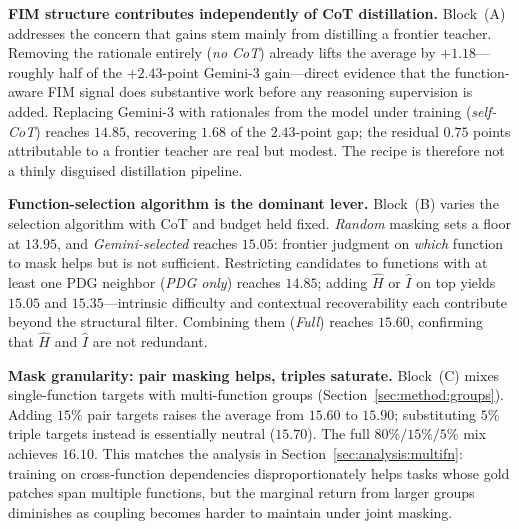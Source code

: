 

\textbf{FIM structure contributes independently of CoT distillation.}
Block~(A) addresses the concern that gains stem mainly from distilling
a frontier teacher. Removing the rationale entirely (\emph{no CoT})
already lifts the average by $+1.18$---roughly half of the $+2.43$-point
Gemini-3 gain---direct evidence that the function-aware FIM signal does
substantive work before any reasoning supervision is added. Replacing
Gemini-3 with rationales from the model under training
(\emph{self-CoT}) reaches $14.85$, recovering $1.68$ of the $2.43$-point
gap; the residual $0.75$ points attributable to a frontier teacher are
real but modest. The recipe is therefore not a thinly disguised
distillation pipeline.

\textbf{Function-selection algorithm is the dominant lever.}
Block~(B) varies the selection algorithm with CoT and budget held
fixed. \emph{Random} masking sets a floor at $13.95$, and
\emph{Gemini-selected} reaches $15.05$: frontier judgment on
\emph{which} function to mask helps but is not sufficient. Restricting
candidates to functions with at least one PDG neighbor (\emph{PDG only})
reaches $14.85$; adding $\hat{H}$ or $\hat{I}$ on top yields $15.05$ and
$15.35$---intrinsic difficulty and contextual recoverability each
contribute beyond the structural filter. Combining them (\emph{Full})
reaches $15.60$, confirming that $\hat{H}$ and $\hat{I}$ are not
redundant.

\textbf{Mask granularity: pair masking helps, triples saturate.}
Block~(C) mixes single-function targets with multi-function groups
(Section~\ref{sec:method:groups}). Adding $15\%$ pair targets raises
the average from $15.60$ to $15.90$; substituting $5\%$ triple targets
instead is essentially neutral ($15.70$). The full $80\%/15\%/5\%$ mix
achieves $16.10$. This matches the analysis in
Section~\ref{sec:analysis:multifn}: training on cross-function
dependencies disproportionately helps tasks whose gold patches span
multiple functions, but the marginal return from larger groups
diminishes as coupling becomes harder to maintain under joint masking.
